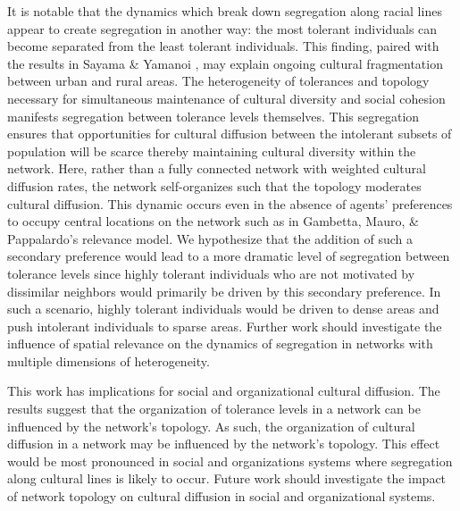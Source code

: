 \documentclass[a4paper]{article}
\begin{document}
It is notable that the dynamics which break down segregation along racial lines appear to create segregation in another way: the most tolerant individuals can become separated from the least tolerant individuals. This finding, paired with the results in Sayama \& Yamanoi \cite{sayama2020beyond}, may explain ongoing cultural fragmentation between urban and rural areas. The heterogeneity of tolerances and topology necessary for simultaneous maintenance of cultural diversity and social cohesion manifests segregation between tolerance levels themselves. This segregation ensures that opportunities for cultural diffusion between the intolerant subsets of population will be scarce thereby maintaining cultural diversity within the network. Here, rather than a fully connected network with weighted cultural diffusion rates, the network self-organizes such that the topology moderates cultural diffusion. This dynamic occurs even in the absence of agents’ preferences to occupy central locations on the network such as in Gambetta, Mauro, \& Pappalardo's \cite{GambettaDaniele2023Mcis} relevance model. We hypothesize that the addition of such a secondary preference would lead to a more dramatic level of segregation between tolerance levels since highly tolerant individuals who are not motivated by dissimilar neighbors would primarily be driven by this secondary preference. In such a scenario, highly tolerant individuals would be driven to dense areas and push intolerant individuals to sparse areas. Further work should investigate the influence of spatial relevance on the dynamics of segregation in networks with multiple dimensions of heterogeneity.

This work has implications for social and organizational cultural diffusion. The results suggest that the organization of tolerance levels in a network can be influenced by the network’s topology. As such, the organization of cultural diffusion in a network may be influenced by the network’s topology. This effect would be most pronounced in social and organizations systems where segregation along cultural lines is likely to occur. Future work should investigate the impact of network topology on cultural diffusion in social and organizational systems.
\end{document}
